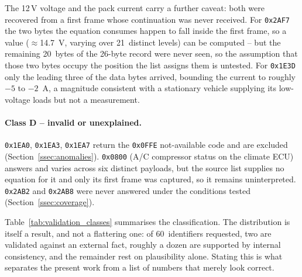 \documentclass[11pt,a4paper,oneside,parskip=half]{scrreprt}
\providecommand{\hex}{}\renewcommand{\hex}[1]{\texttt{0x#1}}
\begin{document}
The 12\,V voltage and the pack current carry a further caveat: both were recovered from a first frame whose continuation was never received. For \hex{2AF7} the two bytes the equation consumes happen to fall inside the first frame, so a value ($\approx$14.7~V, varying over 21~distinct levels) can be computed -- but the remaining 20~bytes of the 26-byte record were never seen, so the assumption that those two bytes occupy the position the list assigns them is untested. For \hex{1E3D} only the leading three of the data bytes arrived, bounding the current to roughly $-5$ to $-2$~A, a magnitude consistent with a stationary vehicle supplying its low-voltage loads but not a measurement.

\paragraph{Class D -- invalid or unexplained.} \hex{1EA0}, \hex{1EA3}, \hex{1EA7} return the \hex{0FFE} not-available code and are excluded (Section~\ref{ssec:anomalies}). \hex{0800} (A/C compressor status on the climate ECU) answers and varies across six distinct payloads, but the source list supplies no equation for it and only its first frame was captured, so it remains uninterpreted. \hex{2AB2} and \hex{2AB8} were never answered under the conditions tested (Section~\ref{ssec:coverage}).

\medskip\noindent
Table~\ref{tab:validation_classes} summarises the classification. The distribution is itself a result, and not a flattering one: of 60~identifiers requested, two are validated against an external fact, roughly a dozen are supported by internal consistency, and the remainder rest on plausibility alone. Stating this is what separates the present work from a list of numbers that merely look correct.
\end{document}
